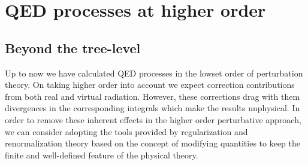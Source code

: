 \documentclass[TheoreticalPhy_ModB.tex]{subfiles}
\begin{document}
\chapter{QED processes at higher order}
\section{Beyond the tree-level}
Up to now we have calculated QED processes in the lowset order of perturbation theory. On taking higher order into account we expect correction contributions from both real and virtual radiation. However, these corrections drag with them divergences in the corresponding integrals which make the results unphysical. In order to remove these inherent effects in the higher order perturbative approach, we can consider adopting the tools provided by regularization and renormalization theory based on the concept of modifying quantities to keep the finite and well-defined feature of the physical theory.
\end{document}
